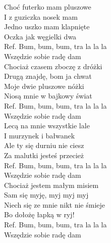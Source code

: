 
\begin{flushleft}
Choć futerko mam pluszowe \tab{} \\
I z guziczka nosek mam \tab{} \\
Jedno uszko mam klapnięte \tab{}  \\
Oczka jak węgielki dwa \tab{}\\
\vskip 3mm
Ref. Bum, bum, bum, tra la la la \\
\hspace{0.9cm}Wszędzie sobie radę dam \tab{} \\
\vskip 3mm
Chociaż czasem zboczę z dróżki \\
Drugą znajdę, bom ja chwat \\
Moje dwie pluszowe nóżki \\
Niosą mnie w bajkowy świat \\
\vskip 3mm
Ref. Bum, bum, bum, tra la la la \\
\hspace{0.9cm}Wszędzie sobie radę dam \\
\vskip 3mm
Lecą na mnie wszystkie lale \\
I murzynek i bałwanek \\
Ale ty się durniu nie ciesz \\
Za malutki jesteś przecież \\
\vskip 3mm
Ref. Bum, bum, bum, tra la la la \\
\hspace{0.9cm}Wszędzie sobie radę dam \\
\vskip 3mm
Chociaż jestem małym misiem \\
Sam się myję, myj myj myj \\
Niech się ze mnie nikt nie śmieje \\
Bo dołożę łapką w ryj! \\
\vskip 3mm
Ref. Bum, bum, bum, tra la la la \\
\hspace{0.9cm}Wszędzie sobie radę dam \\
\end{flushleft}
\clearpage